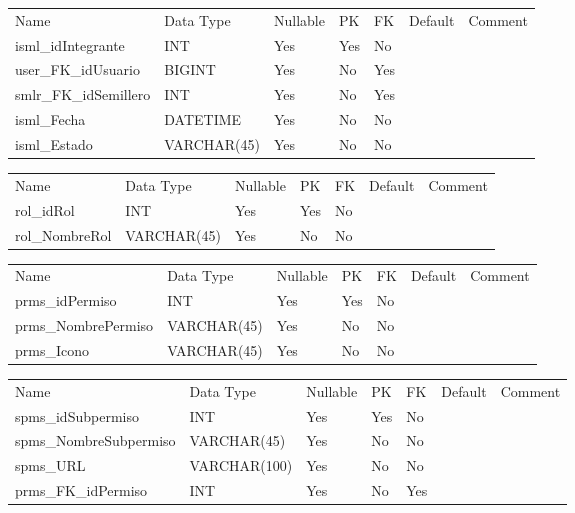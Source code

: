 			\begin{center}
				\begin{tabular}{ |l|l|l|l|l|l|l| }
					\hline
					Name & Data Type & Nullable & PK & FK & Default & Comment \\
					isml_idIntegrante & INT & Yes & Yes & No &  & \\ \hline 
user_FK_idUsuario & BIGINT & Yes & No & Yes &  & \\ \hline 
smlr_FK_idSemillero & INT & Yes & No & Yes &  & \\ \hline 
isml_Fecha & DATETIME & Yes & No & No &  & \\ \hline 
isml_Estado & VARCHAR(45) & Yes & No & No &  & \\ \hline 

				\end{tabular}
			\end{center}
		

			\begin{center}
				\begin{tabular}{ |l|l|l|l|l|l|l| }
					\hline
					Name & Data Type & Nullable & PK & FK & Default & Comment \\
					rol_idRol & INT & Yes & Yes & No &  & \\ \hline 
rol_NombreRol & VARCHAR(45) & Yes & No & No &  & \\ \hline 

				\end{tabular}
			\end{center}
		

			\begin{center}
				\begin{tabular}{ |l|l|l|l|l|l|l| }
					\hline
					Name & Data Type & Nullable & PK & FK & Default & Comment \\
					prms_idPermiso & INT & Yes & Yes & No &  & \\ \hline 
prms_NombrePermiso & VARCHAR(45) & Yes & No & No &  & \\ \hline 
prms_Icono & VARCHAR(45) & Yes & No & No &  & \\ \hline 

				\end{tabular}
			\end{center}
		

			\begin{center}
				\begin{tabular}{ |l|l|l|l|l|l|l| }
					\hline
					Name & Data Type & Nullable & PK & FK & Default & Comment \\
					spms_idSubpermiso & INT & Yes & Yes & No &  & \\ \hline 
spms_NombreSubpermiso & VARCHAR(45) & Yes & No & No &  & \\ \hline 
spms_URL & VARCHAR(100) & Yes & No & No &  & \\ \hline 
prms_FK_idPermiso & INT & Yes & No & Yes &  & \\ \hline 

				\end{tabular}
			\end{center}
		

